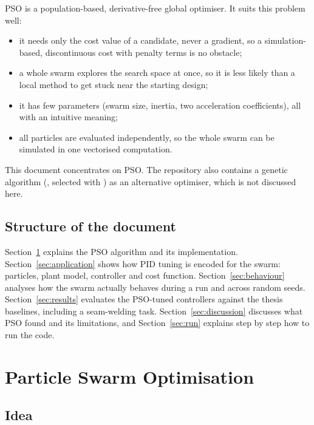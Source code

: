 \documentclass[11pt,a4paper]{article}
\newcommand{\code}[1]{\texttt{\detokenize{#1}}}
\begin{document}
PSO \cite{kennedy1995} is a population-based, derivative-free global optimiser. It suits this problem well:
\begin{itemize}[nosep]
  \item it needs only the cost value of a candidate, never a gradient, so a simulation-based,
        discontinuous cost with penalty terms is no obstacle;
  \item a whole swarm explores the search space at once, so it is less likely than a local method to get
        stuck near the starting design;
  \item it has few parameters (swarm size, inertia, two acceleration coefficients), all with an intuitive
        meaning;
  \item all particles are evaluated independently, so the whole swarm can be simulated in one vectorised
        computation.
\end{itemize}
This document concentrates on PSO. The repository also contains a genetic algorithm
(, selected with \code{--method ga}) as an alternative optimiser, which is not
discussed here.

\subsection{Structure of the document}

Section~\ref{sec:pso} explains the PSO algorithm and its implementation. Section~\ref{sec:application}
shows how PID tuning is encoded for the swarm: particles, plant model, controller and cost function.
Section~\ref{sec:behaviour} analyses how the swarm actually behaves during a run and across random seeds.
Section~\ref{sec:results} evaluates the PSO-tuned controllers against the thesis baselines, including a
seam-welding task. Section~\ref{sec:discussion} discusses what PSO found and its limitations, and
Section~\ref{sec:run} explains step by step how to run the code.

\section{Particle Swarm Optimisation}
\label{sec:pso}

\subsection{Idea}
\end{document}
